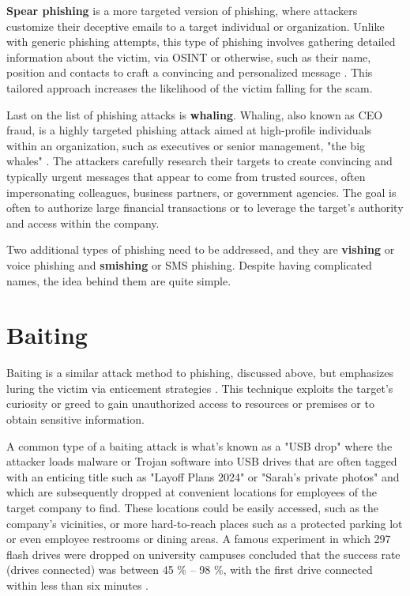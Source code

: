 \textbf{Spear phishing} is a more targeted version of phishing, where attackers customize their deceptive emails to a target individual or organization. Unlike with generic phishing attempts, this type of phishing involves gathering detailed information about the victim, via OSINT or otherwise, such as their name, position and contacts to craft a convincing and personalized message \citep{salahdine_social_2019}. This tailored approach increases the likelihood of the victim falling for the scam.

Last on the list of phishing attacks is \textbf{whaling}. Whaling, also known as CEO fraud, is a highly targeted phishing attack aimed at high-profile individuals within an organization, such as executives or senior management, "the big whales" \citep{abraham_overview_2010}. The attackers carefully research their targets to create convincing and typically urgent messages that appear to come from trusted sources, often impersonating colleagues, business partners, or government agencies. The goal is often to authorize large financial transactions or to leverage the target's authority and access within the company.

Two additional types of phishing need to be addressed, and they are \textbf{vishing} or voice phishing and \textbf{smishing} or SMS phishing. Despite having complicated names, the idea behind them are quite simple.








\section{Baiting}

Baiting is a similar attack method to phishing, discussed above, but emphasizes luring the victim via enticement strategies \citep{conteh_cybersecurityrisks_2016, salahdine_social_2019}. This technique exploits the target's curiosity or greed to gain unauthorized access to resources or premises or to obtain sensitive information.

A common type of a baiting attack is what's known as a "USB drop" where the attacker loads malware or Trojan software into USB drives that are often tagged with an enticing title such as "Layoff Plans 2024" or "Sarah's private photos" and which are subsequently dropped at convenient locations for employees of the target company to find. These locations could be easily accessed, such as the company's vicinities, or more hard-to-reach places such as a protected parking lot or even employee restrooms or dining areas. A famous experiment in which 297 flash drives were dropped on university campuses concluded that the success rate (drives connected) was between 45 \% -- 98 \%, with the first drive connected within less than six minutes \cite{tischer_users_2016}.

